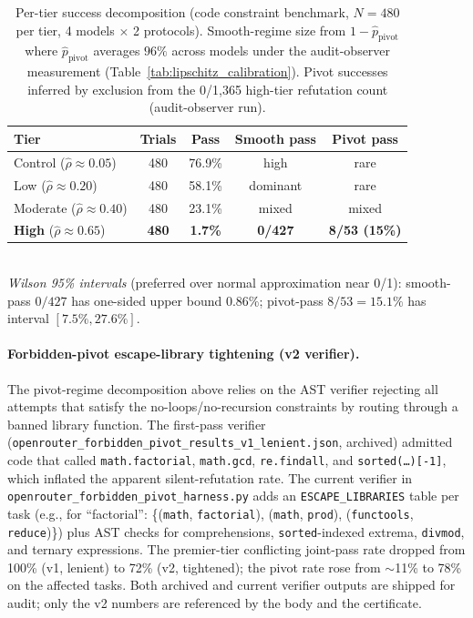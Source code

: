 \documentclass{article}
\theoremstyle{plain}
\theoremstyle{definition}
\theoremstyle{remark}
\newcommand{\rhohat}{\hat{\rho}}
\begin{document}
\begin{table}[ht]
\centering
\footnotesize
\caption{Per-tier success decomposition (code constraint benchmark, $N{=}480$ per tier, 4 models $\times$ 2 protocols). Smooth-regime size from $1{-}\hat{p}_{\text{pivot}}$ where $\hat{p}_{\text{pivot}}$ averages $96\%$ across models under the audit-observer measurement (Table~\ref{tab:lipschitz_calibration}). Pivot successes inferred by exclusion from the 0/1{,}365 high-tier refutation count (audit-observer run).}
\label{tab:tier_pivot_decomposition}
\begin{tabular}{lcccc}
\toprule
Tier & Trials & Pass & Smooth pass & Pivot pass \\
\midrule
Control ($\rhohat{\approx}0.05$) & 480 & 76.9\% & high & rare \\
Low ($\rhohat{\approx}0.20$) & 480 & 58.1\% & dominant & rare \\
Moderate ($\rhohat{\approx}0.40$) & 480 & 23.1\% & mixed & mixed \\
\textbf{High} ($\rhohat{\approx}0.65$) & \textbf{480} & \textbf{1.7\%} & \textbf{0/427} & \textbf{8/53 (15\%)} \\
\bottomrule
\end{tabular}
\\[2pt]
\footnotesize \emph{Wilson 95\% intervals} (preferred over normal approximation near 0/1): smooth-pass $0/427$ has one-sided upper bound $0.86\%$; pivot-pass $8/53 = 15.1\%$ has interval $[7.5\%, 27.6\%]$.
\end{table}

\paragraph{Forbidden-pivot escape-library tightening (v2 verifier).}
The pivot-regime decomposition above relies on the AST verifier rejecting all attempts that satisfy the no-loops/no-recursion constraints by routing through a banned library function. The first-pass verifier (\texttt{openrouter\_forbidden\_pivot\_results\_v1\_lenient.json}, archived) admitted code that called \texttt{math.factorial}, \texttt{math.gcd}, \texttt{re.findall}, and \texttt{sorted(\ldots)[-1]}, which inflated the apparent silent-refutation rate. The current verifier in \texttt{openrouter\_forbidden\_pivot\_harness.py} adds an \texttt{ESCAPE\_LIBRARIES} table per task (e.g., for ``factorial'': \{(\texttt{math}, \texttt{factorial}), (\texttt{math}, \texttt{prod}), (\texttt{functools}, \texttt{reduce})\}) plus AST checks for comprehensions, \texttt{sorted}-indexed extrema, \texttt{divmod}, and ternary expressions. The premier-tier conflicting joint-pass rate dropped from 100\% (v1, lenient) to 72\% (v2, tightened); the pivot rate rose from $\sim$11\% to 78\% on the affected tasks. Both archived and current verifier outputs are shipped for audit; only the v2 numbers are referenced by the body and the certificate.
\end{document}
